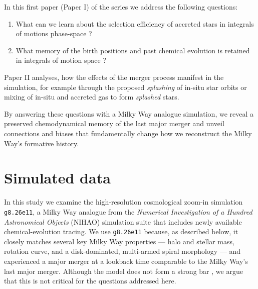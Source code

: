 \documentclass[fleqn,usenatbib]{mnras}
\begin{document}
In this first paper (Paper I) of the series we address the following questions: 
\begin{enumerate}[leftmargin=2em,labelwidth=0em]
    \item What can we learn about the selection efficiency of accreted stars in integrals of motions phase-space \citep{Helmi2018, Feuillet2021, Buder2022, Monty2024}?
    \item What memory of the birth positions and past chemical evolution is retained in integrals of motion space \citep{Skuladottir2025}?
\end{enumerate}

Paper II analyses, how the effects of the merger process manifest in the simulation, for example through the proposed \textit{splashing} of in-situ star orbits \citep{Belokurov2020} or mixing of in-situ and accreted gas to form \textit{splashed} stars.

By answering these questions with a Milky Way analogue simulation, we reveal a preserved chemodynamical memory of the last major merger and unveil connections and biases that fundamentally change how we reconstruct the Milky Way's formative history.

\section{Simulated data} \label{sec:data}

In this study we examine the high-resolution cosmological zoom-in simulation \texttt{g8.26e11}, a Milky Way analogue from the \textit{Numerical Investigation of a Hundred Astronomical Objects} (NIHAO) simulation suite \citep{Wang2015} that includes newly available chemical-evolution tracing.
We use \texttt{g8.26e11} because, as described below, it closely matches several key Milky Way properties — halo and stellar mass, rotation curve, and a disk-dominated, multi-armed spiral morphology — and experienced a major merger at a lookback time comparable to the Milky Way's last major merger.
Although the model does not form a strong bar \citep[see][]{Buder2025}, we argue that this is not critical for the questions addressed here.
\end{document}
